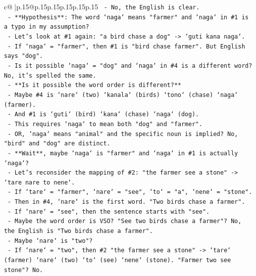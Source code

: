 \documentclass{article}
\begin{document}
{\begin{supertabular}{c@{$\;$}|p{.15\linewidth}@{}p{.15\linewidth}p{.15\linewidth}p{.15\linewidth}p{.15\linewidth}p{.15\linewidth}}
{{{\texttt{               {-} No, the English is clear.} \\
\texttt{               {-} **Hypothesis**: The word `naga` means "farmer" and `naga` in \#1 is a typo in my assumption?} \\
\texttt{               {-} Let's look at \#1 again: "a bird chase a dog" {-}> `guti kana naga`.} \\
\texttt{               {-} If `naga` = "farmer", then \#1 is "bird chase farmer". But English says "dog".} \\
\texttt{               {-} Is it possible `naga` = "dog" and `naga` in \#4 is a different word? No, it's spelled the same.} \\
\texttt{               {-} **Is it possible the word order is different?**} \\
\texttt{                 {-} Maybe \#4 is `nare` (two) `kanala` (birds) `tono` (chase) `naga` (farmer).} \\
\texttt{                 {-} And \#1 is `guti` (bird) `kana` (chase) `naga` (dog).} \\
\texttt{                 {-} This requires `naga` to mean both "dog" and "farmer".} \\
\texttt{                 {-} OR, `naga` means "animal" and the specific noun is implied? No, "bird" and "dog" are distinct.} \\
\texttt{                 {-} **Wait**, maybe `naga` is "farmer" and `naga` in \#1 is actually `naga`?} \\
\texttt{                 {-} Let's reconsider the mapping of \#2: "the farmer see a stone" {-}> `tare nare to nene`.} \\
\texttt{                   {-} If `tare` = "farmer", `nare` = "see", `to` = "a", `nene` = "stone".} \\
\texttt{                   {-} Then in \#4, `nare` is the first word. "Two birds chase a farmer".} \\
\texttt{                   {-} If `nare` = "see", then the sentence starts with "see".} \\
\texttt{                   {-} Maybe the word order is VSO? "See two birds chase a farmer"? No, the English is "Two birds chase a farmer".} \\
\texttt{                   {-} Maybe `nare` is "two"?} \\
\texttt{                     {-} If `nare` = "two", then \#2 "the farmer see a stone" {-}> `tare` (farmer) `nare` (two) `to` (see) `nene` (stone). "Farmer two see stone"? No.} \\
}}}
\end{supertabular}}
\end{document}
